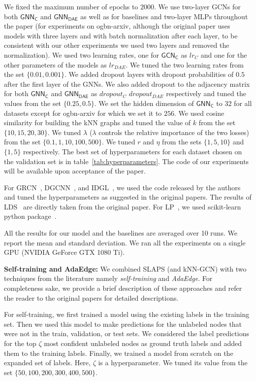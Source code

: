\documentclass{article}
\newcommand{\func}[1]{\ensuremath{\mathsf{#1}}}
\begin{document}
We fixed the maximum number of epochs to $2000$.
We use two-layer GCNs for both $\func{GNN_C}$ and $\func{GNN_{DAE}}$ as well as for baselines and two-layer MLPs throughout the paper (for experiments on ogbn-arxiv, although the original paper uses models with three layers and with batch normalization after each layer, to be consistent with our other experiments we used two layers and removed the normalization). We used two learning rates, one for $\func{GCN_C}$ as $lr_{C}$ and one for the other parameters of the models as $lr_{DAE}$. We tuned the two learning rates from the set $\{0.01, 0.001\}$. We added dropout layers with dropout probabilities of $0.5$ after the first layer of the GNNs. We also added dropout to the adjacency matrix for both $\func{GNN_C}$ and $\func{GNN_{DAE}}$ as $dropout_{C}$ $dropout_{DAE}$ respectively and tuned the values from the set $\{0.25, 0.5\}$. 
We set the hidden dimension of $\func{GNN_C}$ to $32$ for all datasets except for ogbn-arxiv for which we set it to $256$.
We used cosine similarity for building the kNN graphs and tuned the value of $k$ from the set $\{10, 15, 20, 30\}$.
We tuned $\lambda$ ($\lambda$ controls the relative importance of the two losses) from the set $\{0.1, 1, 10, 100, 500\}$. We tuned $r$ and $\eta$ from the sets $\{1, 5, 10\}$ and $\{1, 5\}$ respectively.
The best set of hyperparameters for each dataset chosen on the validation set is in table~\ref{tab:hyperparameters}.
The code of our experiments will be available upon acceptance of the paper.

For GRCN~\citep{GRCN}, DGCNN~\citep{DGCNN}, and IDGL~\citep{IDGL}, we used the code released by the authors and tuned the hyperparameters as suggested in the original papers. 
The results of LDS~\citep{franceschi2019learning} are directly taken from the original paper. 
For LP~\cite{zhu2003semi}, we used scikit-learn python package~\cite{pedregosa2011scikit}.

All the results for our model and the baselines are averaged over 10 runs. We report the mean and standard deviation.
We ran all the experiments on a single GPU (NVIDIA GeForce GTX 1080 Ti).

\textbf{Self-training and AdaEdge:} We combined SLAPS (and kNN-GCN) with two techniques from the literature namely \emph{self-training} and \emph{AdaEdge}. For completeness sake, we provide a brief description of these approaches and refer the reader to the original papers for detailed descriptions.

For self-training, we first trained a model using the existing labels in the training set. Then we used this model to make predictions for the unlabeled nodes that were not in the train, validation, or test sets. We considered the label predictions for the top $\zeta$ most confident unlabeled nodes as ground truth labels and added them to the training labels. Finally, we trained a model from scratch on the expanded set of labels. Here, $\zeta$ is a hyperparameter. We tuned its value from the set $\{50, 100, 200, 300, 400, 500\}$.
\end{document}
